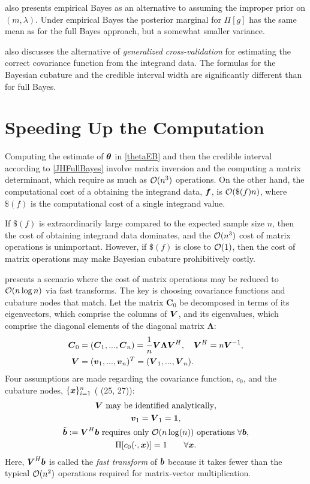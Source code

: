 \documentclass[sts]{imsart}
\numberwithin{equation}{section}
\theoremstyle{plain}
\newcommand{\vC}{\boldsymbol{C}}
\newcommand{\JH}{\citetalias{RatHic19a}}%
\newcommand{\vLambda}{\boldsymbol{\Lambda}}
\begin{document}
\JH{} also presents empirical Bayes as an alternative to assuming the improper prior on $(m,\lambda)$.  Under empirical Bayes the posterior marginal for $\Pi[g]$ has the same mean as for the full Bayes approach, but a somewhat smaller variance.  

\JH{} also discusses the alternative of \emph{generalized cross-validation} for estimating the correct covariance function from the integrand data.  The formulas for the Bayesian cubature and the credible interval width are significantly different than for full Bayes.


\section{Speeding Up the Computation} \label{sec:Match}
Computing the estimate of $\boldsymbol{\theta}$ in \eqref{thetaEB} and then the credible interval according to \eqref{JHFullBayes} involve matrix inversion and the computing a matrix determinant, which require as much as $\operatorname{{\mathcal O}}(n^3)$ operations.  On the other hand, the computational cost of a obtaining the integrand data, $\boldsymbol{f}$, is $\operatorname{{\mathcal O}}(\$(f)n)$, where $\$(f)$ is the computational cost of  a single integrand value.

If $\$(f)$ is extraordinarily large compared to the expected sample size $n$, then the cost of obtaining integrand data dominates, and the $\operatorname{{\mathcal O}}(n^3)$ cost of matrix operations is unimportant.  However, if $\$(f)$ is close to $\operatorname{{\mathcal O}}(1)$, then the cost of matrix operations may make Bayesian cubature prohibitively costly.

\JH{} presents a scenario where the cost of matrix operations may be reduced to $\operatorname{{\mathcal O}}(n \log n)$ via fast transforms.  The key is choosing covariance functions and cubature nodes that match.  Let the matrix $\vC_0$ be decomposed in terms of its eigenvectors, which comprise the columns of $\boldsymbol{V}$, and its eigenvalues, which comprise the diagonal elements of the diagonal matrix $\vLambda$:
\begin{align}
\nonumber
\vC_0 &  = (\vC_1,...,\vC_n) 
= \frac 1n \vV \vLambda \vV^H , 
\quad \vV^H = n \vV^{-1}, \\
\nonumber
\vV &= (\vv_1,...,\vv_n)^T = (\vV_1,...,\vV_n).
\end{align}
Four assumptions are made regarding the covariance function, $c_0$, and the cubature nodes, $\{\boldsymbol{x}\}_{i=1}^n$ (\JH{} (25, 27)):
\begin{subequations} \label{fastcompAssump}
	\begin{gather}
	\label{fastcompAssumpA}
	\vV \text{ may be identified analytically}, \\
	\label{fastcompAssumpB}
	\vv_1 = \vV_1 = \vone, \\
	\label{fastcompAssumpC}
	\tilde{\vb}:=\vV^H \vb  \text{ requires only $\Order(n \log(n))$ operations } \forall \vb, \\
	\Pi[c_0(\cdot,\vx)] = 1 \qquad \forall \vx.
	\end{gather}
\end{subequations}
Here, $\boldsymbol{V}^H \boldsymbol{b}$ is called the \emph{fast transform} of $\boldsymbol{b}$ because it takes fewer than the typical $\operatorname{{\mathcal O}}(n^2)$ operations required for matrix-vector multiplication.
\end{document}
